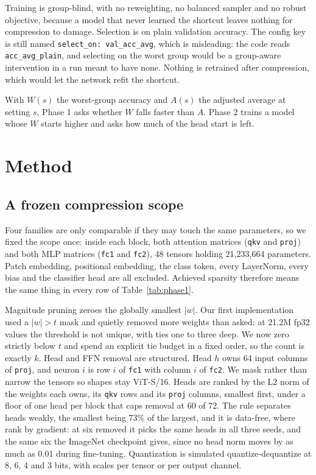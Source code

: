 \documentclass[11pt]{article}
\begin{document}
Training is group-blind, with no reweighting, no balanced sampler and no
robust objective, because a model that never learned the shortcut leaves
nothing for compression to damage. Selection is on plain validation accuracy. The config key is still named
\texttt{select\_on: val\_acc\_avg}, which is misleading: the code reads
\texttt{acc\_avg\_plain}, and selecting on the worst group would be a
group-aware intervention in a run meant to have none. Nothing is
retrained after compression, which would let the network refit the shortcut.

With $W(s)$ the worst-group accuracy and $A(s)$ the adjusted average at
setting $s$, Phase 1 asks whether $W$ falls faster than $A$. Phase 2 trains a
model whose $W$ starts higher and asks how much of the head start is left.

\section{Method}

\subsection{A frozen compression scope}

Four families are only comparable if they may touch the same parameters, so we fixed the scope once: inside each block, both attention matrices (\texttt{qkv} and \texttt{proj})
and both MLP matrices (\texttt{fc1} and \texttt{fc2}), 48 tensors holding
21{,}233{,}664 parameters. Patch embedding, positional
embedding, the class token, every LayerNorm, every bias and the classifier head
are all excluded. Achieved sparsity therefore means the same thing in every row
of Table~\ref{tab:phase1}.

Magnitude pruning zeroes the globally smallest $|w|$. Our first implementation
used a $|w| > t$ mask and quietly removed more weights than asked: at 21.2M fp32 values the threshold is not unique, with ties one to three deep.
We now zero strictly below $t$ and spend an explicit tie budget in a fixed
order, so the count is exactly $k$. Head
and FFN removal are structured. Head $h$ owns 64 input columns of
\texttt{proj}, and neuron $i$ is row $i$ of \texttt{fc1} with column $i$ of
\texttt{fc2}. We mask rather than narrow the tensors so shapes stay ViT-S/16.
Heads are ranked by the L2 norm of the weights each owns, its \texttt{qkv}
rows and its \texttt{proj} columns, smallest first, under a floor of one head
per block that caps removal at 60 of 72. The rule separates heads weakly, the
smallest being 73\% of the largest, and it is data-free, where
\citet{michel2019sixteen} rank by gradient: at six removed it picks the same
heads in all three seeds, and the same six the ImageNet checkpoint gives,
since no head norm moves by as much as 0.01 during fine-tuning. Quantization is simulated quantize-dequantize at 8,
6, 4 and 3 bits, with scales per tensor or per output channel.
\end{document}
